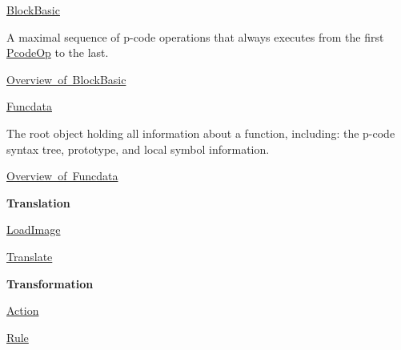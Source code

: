\begin{DoxyItemize}
\item \mbox{\hyperlink{class_block_basic}{Block\+Basic}}
\begin{DoxyItemize}
\item A maximal sequence of p-\/code operations that always executes from the first \mbox{\hyperlink{class_pcode_op}{Pcode\+Op}} to the last.
\item \mbox{\hyperlink{coreclasses_classblockbasic}{Overview of Block\+Basic}}
\end{DoxyItemize}
\item \mbox{\hyperlink{class_funcdata}{Funcdata}}
\begin{DoxyItemize}
\item The root object holding all information about a function, including\+: the p-\/code syntax tree, prototype, and local symbol information.
\item \mbox{\hyperlink{coreclasses_classfuncdata}{Overview of Funcdata}}
\end{DoxyItemize}
\end{DoxyItemize}{\bfseries{Translation}} 
\begin{DoxyItemize}
\item \mbox{\hyperlink{coreclasses_classloadimage}{Load\+Image}}
\item \mbox{\hyperlink{coreclasses_classtranslate}{Translate}}
\end{DoxyItemize}

{\bfseries{Transformation}} 
\begin{DoxyItemize}
\item \mbox{\hyperlink{coreclasses_classaction}{Action}}
\item \mbox{\hyperlink{coreclasses_classrule}{Rule}}
\end{DoxyItemize}

